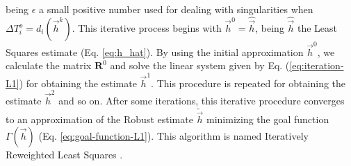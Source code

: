 \documentclass[journal abbreviation, npg]{copernicus}
\begin{document}
being $\epsilon$ a small positive number used for dealing with singularities when $\Delta T^{o}_{i} = d_{i}(\vec{h}^{k})$. This iterative process begins with $\vec{h}^{0} = \hat{\vec{h}}$, being $\hat{\vec{h}}$ the Least Squares estimate (Eq. \ref{eq:h_hat}). By using the initial approximation $\vec{h}^{0}$, we calculate the matrix $\mathbf{R}^{0}$ and solve the linear system given by Eq. (\ref{eq:iteration-L1}) for obtaining the estimate $\vec{h}^{1}$. This procedure is repeated for obtaining the estimate $\vec{h}^{2}$ and so on. After some iterations, this iterative procedure converges to an approximation of the Robust estimate $\tilde{\vec{h}}$ minimizing the goal function $\Gamma(\vec{h})$ (Eq. \ref{eq:goal-function-L1}). This algorithm is named Iteratively Reweighted Least Squares \citep{scales_1988, aster-etal2005}.
\end{document}
